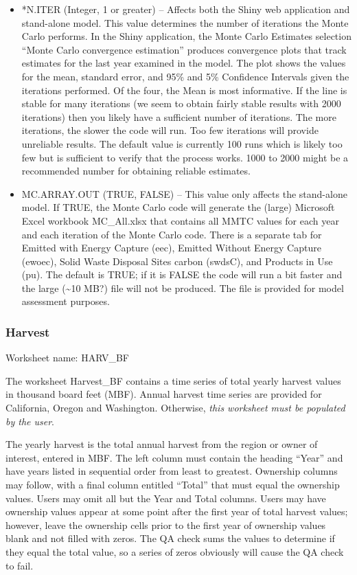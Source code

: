 \documentclass[
  openany]{book}
\begin{document}
\begin{itemize}
\item
  *N.ITER (Integer, 1 or greater) -- Affects both the Shiny web application and stand-alone model. This value determines the number of iterations the Monte Carlo performs. In the Shiny application, the Monte Carlo Estimates selection ``Monte Carlo convergence estimation'' produces convergence plots that track estimates for the last year examined in the model. The plot shows the values for the mean, standard error, and 95\% and 5\% Confidence Intervals given the iterations performed. Of the four, the Mean is most informative. If the line is stable for many iterations (we seem to obtain fairly stable results with 2000 iterations) then you likely have a sufficient number of iterations. The more iterations, the slower the code will run. Too few iterations will provide unreliable results. The default value is currently 100 runs which is likely too few but is sufficient to verify that the process works. 1000 to 2000 might be a recommended number for obtaining reliable estimates.
\item
  MC.ARRAY.OUT (TRUE, FALSE) -- This value only affects the stand-alone model. If TRUE, the Monte Carlo code will generate the (large) Microsoft Excel workbook MC\_All.xlsx that contains all MMTC values for each year and each iteration of the Monte Carlo code. There is a separate tab for Emitted with Energy Capture (eec), Emitted Without Energy Capture (ewoec), Solid Waste Disposal Sites carbon (swdsC), and Products in Use (pu). The default is TRUE; if it is FALSE the code will run a bit faster and the large (\textasciitilde10 MB?) file will not be produced. The file is provided for model assessment purposes.
\end{itemize}

\hypertarget{own-prov-input-harvest}{%
\subsubsection{Harvest}\label{own-prov-input-harvest}}

Worksheet name: HARV\_BF

The worksheet Harvest\_BF contains a time series of total yearly harvest values in thousand board feet (MBF). Annual harvest time series are provided for California, Oregon and Washington. Otherwise, \emph{this worksheet must be populated by the user}.

The yearly harvest is the total annual harvest from the region or owner of interest, entered in MBF. The left column must contain the heading ``Year'' and have years listed in sequential order from least to greatest. Ownership columns may follow, with a final column entitled ``Total'' that must equal the ownership values. Users may omit all but the Year and Total columns. Users may have ownership values appear at some point after the first year of total harvest values; however, leave the ownership cells prior to the first year of ownership values blank and not filled with zeros. The QA check sums the values to determine if they equal the total value, so a series of zeros obviously will cause the QA check to fail.
\end{document}
